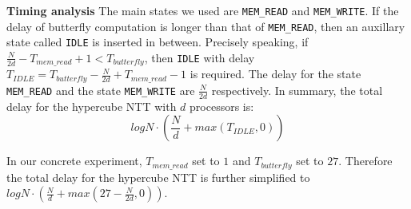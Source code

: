 \documentclass[submission]{iacrtrans}
\theoremstyle{plain}
\begin{document}
 \begin{table}[!t]\centering
 \caption{Performance of the configurable hypercube NTT hardware for FHEW-like FHE schemes on Xilinx Artix-7 FPGA}
 \label{table:hypercube-ntt-result}
 \begin{minipage}{\textwidth}\centering
 \end{minipage}
 \vspace{0mm}
 \end{table}


\textbf{Timing analysis} The main states we used are \texttt{MEM\_READ} and \texttt{MEM\_WRITE}. If the delay of butterfly computation is longer than that of \texttt{MEM\_READ}, then an auxillary state called \texttt{IDLE} is inserted in between. Precisely speaking, if $\frac{N}{2d}-T_{mem\_read}+1<T_{butterfly}$, then \texttt{IDLE} with delay $T_{IDLE}=T_{butterfly}-\frac{N}{2d}+T_{mem\_read}-1$ is required. The delay for the state \texttt{MEM\_READ} and the state \texttt{MEM\_WRITE} are $\frac{N}{2d}$ respectively. In summary, the total delay for the hypercube NTT with $d$ processors is:
\[
    logN\cdot\left(\frac{N}{d}+max(T_{IDLE},0)\right )
\]

In our concrete experiment, $T_{mem\_read}$ set to $1$ and $T_{butterfly}$ set to $27$. Therefore the total delay for the hypercube NTT is further simplified to $logN\cdot(\frac{N}{d}+max(27-\frac{N}{2d},0))$.
\end{document}
